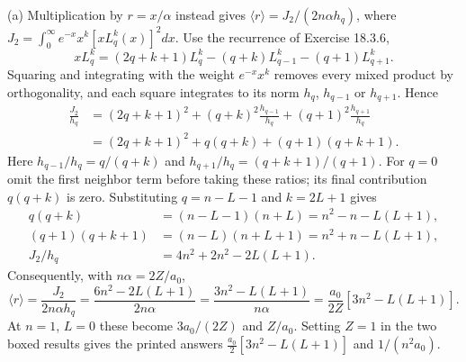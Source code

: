 (a) Multiplication by $r=x/\alpha$ instead gives
$\langle r\rangle=J_2/(2n\alpha h_q)$, where
$J_2=\int_0^\infty e^{-x}x^k[xL_q^k(x)]^2dx$.
Use the recurrence of Exercise 18.3.6,
\[
xL_q^k=(2q+k+1)L_q^k-(q+k)L_{q-1}^k-(q+1)L_{q+1}^k.
\]
Squaring and integrating with the weight $e^{-x}x^k$ removes every
mixed product by orthogonality, and each square integrates to its norm
$h_q$, $h_{q-1}$ or $h_{q+1}$.  Hence
\begin{align*}
\frac{J_2}{h_q}
 &=(2q+k+1)^2+(q+k)^2\frac{h_{q-1}}{h_q}
                       +(q+1)^2\frac{h_{q+1}}{h_q}\\
 &=(2q+k+1)^2+q(q+k)+(q+1)(q+k+1).
\end{align*}
Here $h_{q-1}/h_q=q/(q+k)$ and
$h_{q+1}/h_q=(q+k+1)/(q+1)$.  For $q=0$ omit the first
neighbor term before taking these ratios; its final contribution
$q(q+k)$ is zero.  Substituting $q=n-L-1$ and $k=2L+1$ gives
\begin{align*}
q(q+k)&=(n-L-1)(n+L)=n^2-n-L(L+1),\\
(q+1)(q+k+1)&=(n-L)(n+L+1)=n^2+n-L(L+1),\\
J_2/h_q&=4n^2+2n^2-2L(L+1).
\end{align*}
Consequently, with $n\alpha=2Z/a_0$,
\[
\langle r\rangle=\frac{J_2}{2n\alpha h_q}
 =\frac{6n^2-2L(L+1)}{2n\alpha}
 =\frac{3n^2-L(L+1)}{n\alpha}
 =\boxed{\frac{a_0}{2Z}[3n^2-L(L+1)]}.
\]
At $n=1$, $L=0$ these become $3a_0/(2Z)$ and $Z/a_0$.  Setting
$Z=1$ in the two boxed results gives the printed answers
$\frac{a_0}2[3n^2-L(L+1)]$ and $1/(n^2a_0)$.

